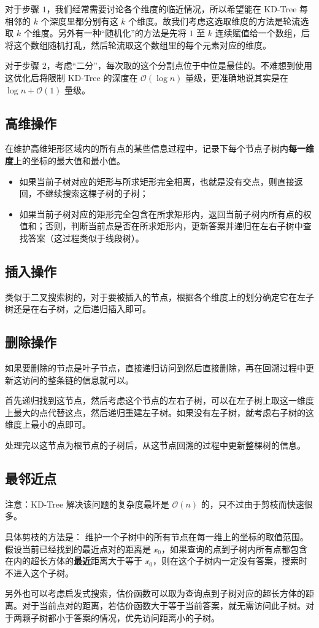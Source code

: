 对于步骤 $1$，我们经常需要讨论各个维度的临近情况，所以希望能在 KD-Tree 每相邻的 $k$ 个深度里都分别有这 $k$ 个维度。故我们考虑这选取维度的方法是轮流选取 $k$ 个维度。另外有一种“随机化”的方法是先将 $1$ 至 $k$ 连续赋值给一个数组，后将这个数组随机打乱，然后轮流取这个数组里的每个元素对应的维度。

对于步骤 $2$，考虑“二分”，每次取的这个分割点位于中位是最佳的。不难想到使用这优化后将限制 KD-Tree 的深度在 $\mathcal O\left(\log n\right)$ 量级，更准确地说其实是在 $\log n + \mathcal O(1)$ 量级。

\subsection{高维操作}

在维护高维矩形区域内的所有点的某些信息过程中，记录下每个节点子树内\textbf{每一维度}上的坐标的最大值和最小值。

\begin{itemize}
\item 如果当前子树对应的矩形与所求矩形完全相离，也就是没有交点，则直接返回，不继续搜索这棵子树的子树；

\item 如果当前子树对应的矩形完全包含在所求矩形内，返回当前子树内所有点的权值和；否则，判断当前点是否在所求矩形内，更新答案并递归在左右子树中查找答案（这过程类似于线段树）。
\end{itemize}

\subsection{插入操作}

类似于二叉搜索树的，对于要被插入的节点，根据各个维度上的划分确定它在左子树还是在右子树，之后递归插入即可。

\subsection{删除操作}
如果要删除的节点是叶子节点，直接递归访问到然后直接删除，再在回溯过程中更新这访问的整条链的信息就可以。

首先递归找到这节点，然后考虑这个节点的左右子树，可以在左子树上取这一维度上最大的点代替这点，然后递归重建左子树。如果没有左子树，就考虑右子树的这维度上最小的点即可。

处理完以这节点为根节点的子树后，从这节点回溯的过程中更新整棵树的信息。


\subsection{最邻近点}
注意：KD-Tree 解决该问题的复杂度最坏是 $\mathcal O(n)$ 的，只不过由于剪枝而快速很多。

具体剪枝的方法是：
维护一个子树中的所有节点在每一维上的坐标的取值范围。假设当前已经找到的最近点对的距离是 $\mathscr x_0$，如果查询的点到子树内所有点都包含在内的超长方体的\textbf{最近}距离大于等于 $\mathscr x_0$，则在这个子树内一定没有答案，搜索时不进入这个子树。

另外也可以考虑启发式搜索，估价函数可以取为查询点到子树对应的超长方体的距离。对于当前点对的距离，若估价函数大于等于当前答案，就无需访问此子树。对于两颗子树都小于答案的情况，优先访问距离小的子树。

